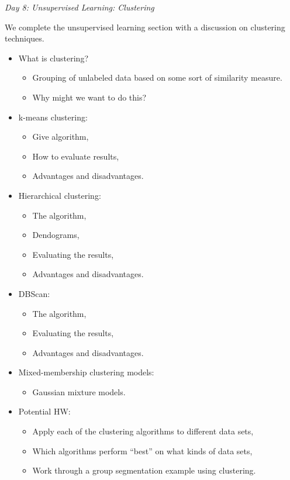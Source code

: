 \documentclass[12pt]{article}
\begin{document}
	\vspace{2mm}
	\noindent
	\textit{\large{Day 8: Unsupervised Learning: Clustering}}
	
	\noindent
	We complete the unsupervised learning section with a discussion on clustering techniques.
	\begin{itemize}
		\item What is clustering?
		\begin{itemize}
			\item Grouping of unlabeled data based on some sort of similarity measure.
			\item Why might we want to do this?
		\end{itemize}
		\item k-means clustering:
		\begin{itemize}
			\item Give algorithm,
			\item How to evaluate results,
			\item Advantages and disadvantages.
		\end{itemize}
		\item Hierarchical clustering:
		\begin{itemize}
			\item The algorithm,
			\item Dendograms,
			\item Evaluating the results,
			\item Advantages and disadvantages.
		\end{itemize}
		\item DBScan:
		\begin{itemize}
			\item The algorithm,
			\item Evaluating the results,
			\item Advantages and disadvantages.
		\end{itemize}
		\item Mixed-membership clustering models:
		\begin{itemize}
			\item Gaussian mixture models.
		\end{itemize}
		\item Potential HW:
		\begin{itemize}
			\item Apply each of the clustering algorithms to different data sets,
			\item Which algorithms perform ``best'' on what kinds of data sets,
			\item Work through a group segmentation example using clustering.
		\end{itemize}
	\end{itemize}
	
\end{document}

